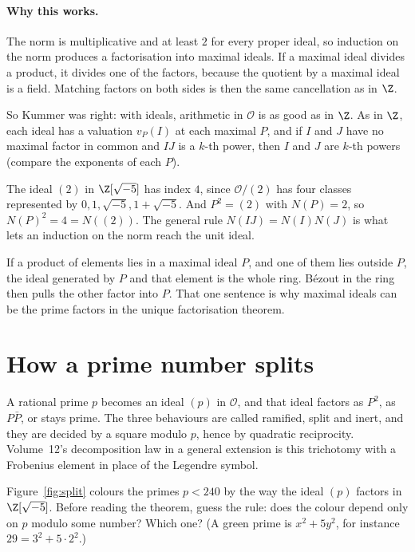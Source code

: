 \paragraph{Why this works.}
The norm is multiplicative and at least $2$ for every proper ideal, so induction on the norm produces a factorisation into maximal ideals. If a maximal ideal divides a product, it divides one of the factors, because the quotient by a maximal ideal is a field. Matching factors on both sides is then the same cancellation as in $\Z$.

So Kummer was right: with ideals, arithmetic in $\mathcal O$ is as good as in $\Z$. As in $\Z$, each ideal has a valuation $v_P(I)$ at each maximal $P$, and if $I$ and $J$ have no maximal factor in common and $IJ$ is a $k$-th power, then $I$ and $J$ are $k$-th powers (compare the exponents of each $P$).

\begin{examplex}
The ideal $(2)$ in $\Z[\sqrt{-5}]$ has index $4$, since $\mathcal O/(2)$ has four classes represented by $0,1,\sqrt{-5},1+\sqrt{-5}$. And $P^2=(2)$ with $N(P)=2$, so $N(P)^2=4=N((2))$. The general rule $N(IJ)=N(I)N(J)$ is what lets an induction on the norm reach the unit ideal.
\end{examplex}

\begin{examplex}
If a product of elements lies in a maximal ideal $P$, and one of them lies outside $P$, the ideal generated by $P$ and that element is the whole ring. Bézout in the ring then pulls the other factor into $P$. That one sentence is why maximal ideals can be the prime factors in the unique factorisation theorem.
\end{examplex}

\section{How a prime number splits}

A rational prime $p$ becomes an ideal $(p)$ in $\mathcal O$, and that ideal factors as $P^2$, as $P\bar P$, or stays prime. The three behaviours are called ramified, split and inert, and they are decided by a square modulo $p$, hence by quadratic reciprocity. Volume~12's decomposition law in a general extension is this trichotomy with a Frobenius element in place of the Legendre symbol.

\begin{think}
Figure~\ref{fig:split} colours the primes $p<240$ by the way the ideal $(p)$ factors in $\Z[\sqrt{-5}]$. Before reading the theorem, guess the rule: does the colour depend only on $p$ modulo some number? Which one? (A green prime is $x^2+5y^2$, for instance $29=3^2+5\cdot2^2$.)
\end{think}

